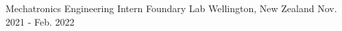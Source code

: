 
\begin{cventries}
  \cventry
    {Mechatronics Engineering Intern}
    {Foundary Lab}
    {Wellington, New Zealand}
    {Nov. 2021 - Feb. 2022}
    {
      \begin{cvitems}
        \item{}
      \end{cvitems}
    }


\end{cventries}

